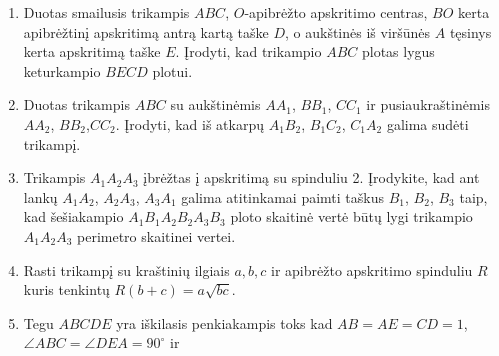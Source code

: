 \begin{enumerate}
\item Duotas smailusis trikampis $ABC$, $O$-apibrėžto
  apskritimo centras, $BO$ kerta apibrėžtinį apskritimą
  antrą kartą taške $D$, o aukštinės iš viršūnės $A$ tęsinys
  kerta apskritimą taške $E$. Įrodyti, kad trikampio $ABC$
  plotas lygus keturkampio $BECD$ plotui.
\item Duotas trikampis $ABC$ su aukštinėmis $AA_1$, $BB_1$,
  $CC_1$ ir pusiaukraštinėmis $AA_2$, $BB_2$,$CC_2$.
  Įrodyti, kad iš atkarpų $A_1B_2$, $B_1C_2$, $C_1A_2$
  galima sudėti trikampį.
\item Trikampis $A_1A_2A_3$ įbrėžtas į apskritimą su
  spinduliu 2. Įrodykite, kad ant lankų $A_1A_2$, $A_2A_3$,
  $A_3A_1$ galima atitinkamai paimti taškus $B_1$, $B_2$,
  $B_3$ taip, kad šešiakampio $A_1B_1A_2B_2A_3B_3$ ploto
  skaitinė vertė būtų lygi trikampio $A_1A_2A_3$ perimetro
  skaitinei vertei.
\item Rasti trikampį su kraštinių ilgiais $a, b, c$ ir
  apibrėžto apskritimo spinduliu $R$ kuris tenkintų $R(b+c)
  = a\sqrt{bc}$.
\item Tegu $ABCDE$ yra iškilasis penkiakampis toks kad
  $AB=AE=CD=1$, $\angle ABC=\angle DEA=90^\circ$ ir

\end{enumerate}
